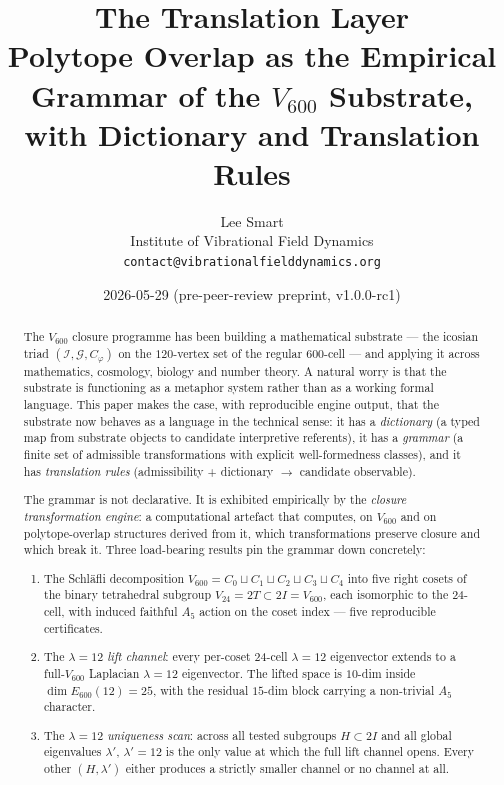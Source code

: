 \documentclass[11pt,a4paper]{article}
\title{\textbf{The Translation Layer}\\[0.4em]
\large Polytope Overlap as the Empirical Grammar of the $V_{600}$ Substrate, with Dictionary and Translation Rules}
\author{Lee Smart\\
\small Institute of Vibrational Field Dynamics\\
\small \texttt{contact@vibrationalfielddynamics.org}}
\date{2026-05-29 \quad (pre-peer-review preprint, v1.0.0-rc1)}
\newcommand{\II}{\mathcal{I}}
\newcommand{\Vsix}{V_{600}}
\newcommand{\Vtf}{V_{24}}
\newcommand{\Cphi}{C_\varphi}
\newcommand{\Esix}{E_{600}}
\begin{document}
\maketitle

\begin{abstract}
\noindent
The $V_{600}$ closure programme has been building a mathematical
substrate --- the icosian triad $(\II, \mathcal{G}, \Cphi)$ on the
$120$-vertex set of the regular $600$-cell --- and applying it
across mathematics, cosmology, biology and number theory. A natural
worry is that the substrate is functioning as a metaphor system
rather than as a working formal language. This paper makes the
case, with reproducible engine output, that the substrate now
behaves as a language in the technical sense: it has a
\emph{dictionary} (a typed map from substrate objects to candidate
interpretive referents), it has a \emph{grammar} (a finite set of
admissible transformations with explicit well-formedness
classes), and it has \emph{translation rules} (admissibility +
dictionary $\to$ candidate observable).

The grammar is not declarative. It is exhibited empirically by the
\emph{closure transformation engine}: a computational artefact that
computes, on $\Vsix$ and on polytope-overlap structures derived from
it, which transformations preserve closure and which break it.
Three load-bearing results pin the grammar down concretely:

\begin{enumerate}[leftmargin=*]
  \item The Schl\"afli decomposition
        $\Vsix = C_0 \sqcup C_1 \sqcup C_2 \sqcup C_3 \sqcup C_4$
        into five right cosets of the binary tetrahedral subgroup
        $\Vtf = 2T \subset 2I = \Vsix$, each isomorphic to the
        24-cell, with induced faithful $A_5$ action on the coset
        index --- five reproducible certificates.
  \item The $\lambda = 12$ \emph{lift channel}: every per-coset
        24-cell $\lambda = 12$ eigenvector extends to a full-$\Vsix$
        Laplacian $\lambda = 12$ eigenvector. The lifted space is
        $10$-dim inside $\dim \Esix(12) = 25$, with the residual
        $15$-dim block carrying a non-trivial $A_5$ character.
  \item The $\lambda = 12$ \emph{uniqueness scan}: across all tested
        subgroups $H \subset 2I$ and all global eigenvalues
        $\lambda'$, $\lambda' = 12$ is the only value at which the
        full lift channel opens. Every other $(H, \lambda')$ either
        produces a strictly smaller channel or no channel at all.
\end{enumerate}


\end{abstract}
\end{document}
